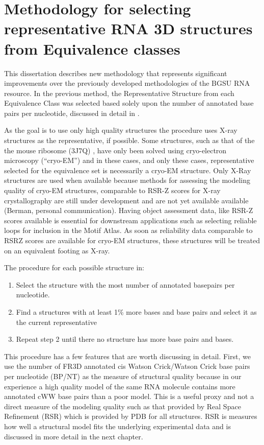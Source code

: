 \section{Methodology for selecting representative RNA 3D structures from
Equivalence classes}

This dissertation describes new methodology that represents significant
improvements over the previously developed methodologies of the BGSU RNA
resource. In the previous method, the Representative Structure from each
Equivalence Class was selected based solely upon the number of annotated base
pairs per nucleotide, discussed in detail in \cite{Leontis2012b}.

As the goal is to use only high quality structures the procedure uses X-ray
structures as the representative, if possible. Some structures, such as that of
the the mouse ribosome (3J7Q) \cite{Voorhees2014}, have only been solved using
cryo-electron microscopy (``cryo-EM'') and in these cases, and only these cases,
representative selected for the equivalence set is necessarily a cryo-EM
structure. Only X-Ray structures are used when available because methods for
assessing the modeling quality of cryo-EM structures, comparable to RSR-Z scores
for X-ray crystallography are still under development and are not yet available
available (Berman, personal communication). Having object assessment data, like
RSR-Z scores available is essential for downstream applications such as
selecting reliable loops for inclusion in the Motif Atlas. As soon as
reliability data comparable to RSRZ scores are available for cryo-EM structures,
these structures will be treated on an equivalent footing as X-ray.

The procedure for each possible structure in:

\begin{enumerate}
  \item Select the structure with the most number of annotated basepairs per
    nucleotide.

  \item Find a structures with at least 1\% more bases and base pairs and select
    it as the current representative

  \item Repeat step 2 until there no structure has more base pairs and bases.
\end{enumerate}

This procedure has a few features that are worth discussing in detail. First, we
use the number of FR3D annotated cis Watson Crick/Watson Crick base pairs per
nucleotide (BP/NT) as the measure of structural quality because in our
experience a high quality model of the same RNA molecule contains more annotated
cWW base pairs than a poor model. This is a useful proxy and not a direct
measure of the modeling quality such as that provided by Real Space Refinement
(RSR) which is provided by PDB for all structures. RSR is measures how well a
structural model fits the underlying experimental data and is discussed in more
detail in the next chapter.

